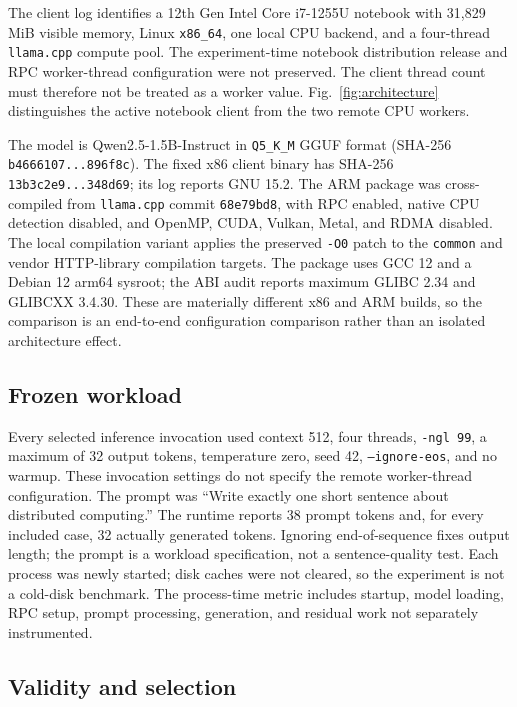\documentclass[letterpaper,conference]{IEEEtran}
\begin{document}
The client log identifies a 12th Gen Intel Core i7-1255U notebook with 31,829 MiB visible memory, Linux \texttt{x86\_64}, one local CPU backend, and a four-thread \texttt{llama.cpp} compute pool. The experiment-time notebook distribution release and RPC worker-thread configuration were not preserved. The client thread count must therefore not be treated as a worker value. Fig.~\ref{fig:architecture} distinguishes the active notebook client from the two remote CPU workers.

The model is Qwen2.5-1.5B-Instruct in \texttt{Q5\_K\_M} GGUF format (SHA-256 \texttt{b4666107...896f8c}). The fixed x86 client binary has SHA-256 \texttt{13b3c2e9...348d69}; its log reports GNU 15.2. The ARM package was cross-compiled from \texttt{llama.cpp} commit \texttt{68e79bd8}, with RPC enabled, native CPU detection disabled, and OpenMP, CUDA, Vulkan, Metal, and RDMA disabled. The local compilation variant applies the preserved \texttt{-O0} patch to the \texttt{common} and vendor HTTP-library compilation targets. The package uses GCC 12 and a Debian 12 arm64 sysroot; the ABI audit reports maximum GLIBC 2.34 and GLIBCXX 3.4.30. These are materially different x86 and ARM builds, so the comparison is an end-to-end configuration comparison rather than an isolated architecture effect.

\subsection{Frozen workload}

Every selected inference invocation used context 512, four threads, \texttt{-ngl 99}, a maximum of 32 output tokens, temperature zero, seed 42, \texttt{--ignore-eos}, and no warmup. These invocation settings do not specify the remote worker-thread configuration. The prompt was “Write exactly one short sentence about distributed computing.” The runtime reports 38 prompt tokens and, for every included case, 32 actually generated tokens. Ignoring end-of-sequence fixes output length; the prompt is a workload specification, not a sentence-quality test. Each process was newly started; disk caches were not cleared, so the experiment is not a cold-disk benchmark. The process-time metric includes startup, model loading, RPC setup, prompt processing, generation, and residual work not separately instrumented.

\subsection{Validity and selection}
\end{document}
